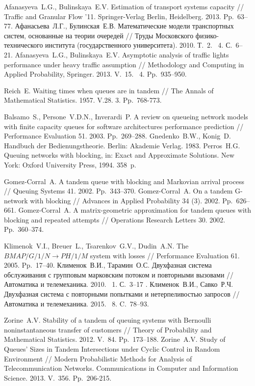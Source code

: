 \documentclass[a4paper,twoside]{article}
\theoremstyle{theorem}
\theoremstyle{remark}
\newcommand{\No}{\textnumero}
\begin{document}
\begin{thebibliography}{99}
 Afanasyeva~L.G., Bulinskaya~E.V. Estimation of transport systems capacity // Traffic and Granular Flow '11. Springer-Verlag Berlin, Heidelberg. 2013. Pp.~63--77.
 Афанасьева~Л.Г., Булинская~Е.В. Математические модели транспортных систем, основанные на теории очередей // Труды Московского физико-технического института (государственного университета). 2010. Т.~2. \No{}~4. С.~6–21.
 Afanasyeva~L.G., Bulinskaya~E.V. Asymptotic analysis of traffic lights performance under heavy traffic assumption // Methodology and Computing in Applied Probability, Springer. 2013. V.~15. \No{}~4. Pp.~935--950.

 Reich~E.  Waiting times when queues are in tandem // The Annals of Mathematical Statistics. 1957. V.28. \No{}3. Pp.~768-773.

 Balsamo~S., Persone~V.D.N., Inverardi~P. A review on queueing network models with finite capacity queues for software architectures performance prediction // Performance Evaluation 51. 2003. Pp.~269–288.
 Gnedenko~B.W., Konig~D. Handbuch der Bedienungstheorie. Berlin: Akademie Verlag. 1983. 
 Perros~H.G.  Queuing networks with blocking, in: Exact and Approximate Solutions. New York: Oxford University Press, 1994. 358~p.


 Gomez-Corral~A. A tandem queue with blocking and Markovian arrival process // Queuing Systems 41. 2002. Pp.~343--370.
 Gomez-Corral~A. On a tandem G-network with blocking // Advances in Applied Probability 34 (3). 2002. Pp.~626--661.
 Gomez-Corral~A. A matrix-geometric approximation for tandem queues with blocking and repeated attempts // Operations Research Letters  30. 2002. Pp.~360--374.

 Klimenok~V.I., Breuer~L., Tsarenkov~G.V., Dudin~A.N. The $BMAP/G/1/N \to PH/1/M$ system with losses // Performance Evaluation 61. 2005. Pp.~17--40.
 Клименок~В.И., Тарамин~О.С. Двухфазная система обслуживания с групповым марковским потоком и повторными вызовами // Автоматика и телемеханика. 2010. \No~1. С.~3--17 .
 Клименок~В.И., Савко~Р.Ч. Двухфазная система с повторными попытками и нетерпеливостью запросов // Автоматика и телемеханика. 2015. \No{}~8. C.~78--93. 

 Zorine~A.V. Stability of a tandem of queuing systems with Bernoulli noninstantaneous transfer of customers // Theory of Probability and Mathematical Statistics. 2012. V.~84. Pp.~173--188.
 Zorine~A.V. Study of Queues' Sizes in Tandem Intersections under Cyclic Control in Random Environment // Modern Probabilistic Methods for Analysis of Telecommunication Networks. Communications in Computer and Information Science. 2013. V.~356. Pp.~206-215.


\end{thebibliography}
\end{document}

